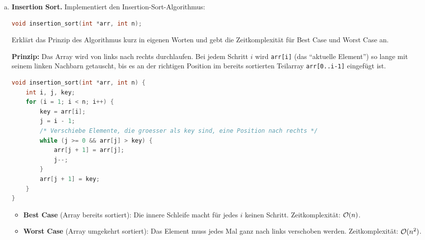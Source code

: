 \begin{enumerate}[a)]
\begin{loesung}
Zeitkomplexität im schlechtesten Fall: $\oh(\log n)$ -- bei jedem Schritt wird der Suchbereich halbiert.
Im Vergleich zur linearen Suche ($\oh(n)$) ist die binäre Suche für große, sortierte Arrays wesentlich effizienter.
Beispiel: $n = 1{.}000{.}000$ erfordert binär höchstens $\lceil \log_2 1{.}000{.}000 \rceil = 20$ Schritte,
linear im Worst Case eine Million.
\end{loesung}

\item \textbf{Insertion Sort.}
Implementiert den Insertion-Sort-Algorithmus:

\begin{lstlisting}[language=C]
void insertion_sort(int *arr, int n);
\end{lstlisting}

Erklärt das Prinzip des Algorithmus kurz in eigenen Worten und gebt die Zeitkomplexität für Best Case und Worst Case an.

\begin{loesung}
\textbf{Prinzip:} Das Array wird von links nach rechts durchlaufen.
Bei jedem Schritt $i$ wird \texttt{arr[i]} (das \enquote{aktuelle Element}) so lange mit seinem linken Nachbarn
getauscht, bis es an der richtigen Position im bereits sortierten Teilarray \texttt{arr[0..i-1]} eingefügt ist.

\begin{lstlisting}[language=C]
void insertion_sort(int *arr, int n) {
    int i, j, key;
    for (i = 1; i < n; i++) {
        key = arr[i];
        j = i - 1;
        /* Verschiebe Elemente, die groesser als key sind, eine Position nach rechts */
        while (j >= 0 && arr[j] > key) {
            arr[j + 1] = arr[j];
            j--;
        }
        arr[j + 1] = key;
    }
}
\end{lstlisting}

\begin{itemize}
  \item \textbf{Best Case} (Array bereits sortiert): Die innere Schleife macht für jedes $i$ keinen Schritt.
  Zeitkomplexität: $\oh(n)$.
  \item \textbf{Worst Case} (Array umgekehrt sortiert): Das Element muss jedes Mal ganz nach links verschoben werden.
  Zeitkomplexität: $\mathcal{O}(n^2)$.
\end{itemize}
\end{loesung}

\end{enumerate}


